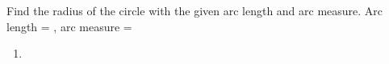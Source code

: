 Find the radius of the circle with the given arc length and arc measure.
\newline
Arc length = , arc measure = \degree
\newline
\begin{enumerate}
    \item
\end{enumerate}

